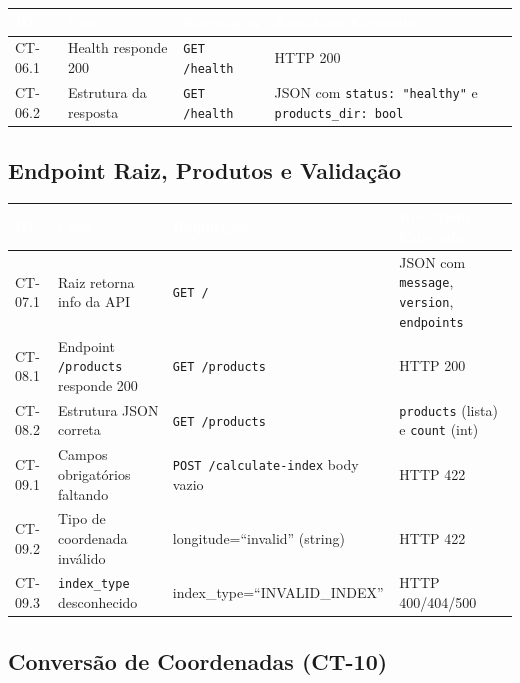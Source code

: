 \documentclass[11pt, a4paper]{article}
\begin{document}
\begin{table}[H]
\centering
\footnotesize
{}
\begin{tabularx}{\textwidth}{@{}p{1.5cm}p{4cm}p{3.5cm}X@{}}
\toprule
\rowcolor{tabheader}\textcolor{white}{\textbf{ID}} & \textcolor{white}{\textbf{Caso}} & \textcolor{white}{\textbf{Requisição}} & \textcolor{white}{\textbf{Resultado Esperado}}\\
\midrule
CT-06.1 & Health responde 200 & \texttt{GET /health} & HTTP 200\\
CT-06.2 & Estrutura da resposta & \texttt{GET /health} & JSON com \texttt{status: "healthy"} e \texttt{products\_dir: bool}\\
\bottomrule
\end{tabularx}
\end{table}

\subsection{Endpoint Raiz, Produtos e Validação}

\begin{table}[H]
\centering
\footnotesize
{}
\begin{tabularx}{\textwidth}{@{}p{1.5cm}p{4.5cm}p{3.5cm}X@{}}
\toprule
\rowcolor{tabheader}\textcolor{white}{\textbf{ID}} & \textcolor{white}{\textbf{Caso}} & \textcolor{white}{\textbf{Requisição}} & \textcolor{white}{\textbf{Resultado Esperado}}\\
\midrule
CT-07.1 & Raiz retorna info da API & \texttt{GET /} & JSON com \texttt{message}, \texttt{version}, \texttt{endpoints}\\
CT-08.1 & Endpoint \texttt{/products} responde 200 & \texttt{GET /products} & HTTP 200\\
CT-08.2 & Estrutura JSON correta & \texttt{GET /products} & \texttt{products} (lista) e \texttt{count} (int)\\
CT-09.1 & Campos obrigatórios faltando & \texttt{POST /calculate-index} body vazio & HTTP 422\\
CT-09.2 & Tipo de coordenada inválido & longitude=``invalid'' (string) & HTTP 422\\
CT-09.3 & \texttt{index\_type} desconhecido & index\_type=``INVALID\_INDEX'' & HTTP 400/404/500\\
\bottomrule
\end{tabularx}
\end{table}

\subsection{Conversão de Coordenadas (CT-10)}
\end{document}
